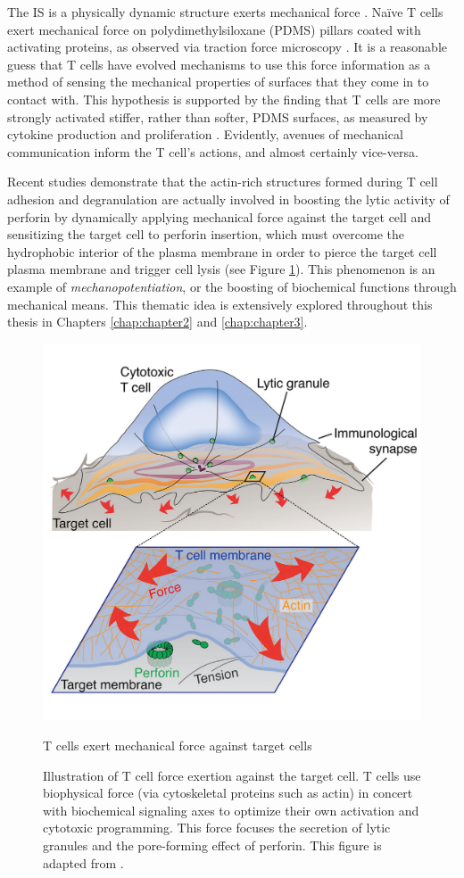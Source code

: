 The IS is a physically dynamic structure exerts mechanical force \cite{Ritter2015, Bashour2014}. Naïve T cells exert mechanical force on polydimethylsiloxane (PDMS) pillars coated with activating proteins, as observed via traction force microscopy \cite{Bashour2014}. It is a reasonable guess that T cells have evolved mechanisms to use this force information as a method of sensing the mechanical properties of surfaces that they come in to contact with. This hypothesis is supported by the finding that T cells are more strongly activated stiffer, rather than softer, PDMS surfaces, as measured by cytokine production and proliferation \cite{Connor2012}. Evidently, avenues of mechanical communication inform the T cell's actions, and almost certainly vice-versa.

Recent studies demonstrate that the actin-rich structures formed during T cell adhesion and degranulation are actually involved in boosting the lytic activity of perforin by dynamically applying mechanical force against the target cell \cite{Basu2016, Tamzalit2018} and sensitizing the target cell to perforin insertion, which must overcome the hydrophobic interior of the plasma membrane in order to pierce the target cell plasma membrane and trigger cell lysis (see Figure \ref{fig:mechforce}). This phenomenon is an example of \textit{mechanopotentiation}, or the boosting of biochemical functions through mechanical means. This thematic idea is extensively explored throughout this thesis in Chapters \ref{chap:chapter2} and \ref{chap:chapter3}.

\begin{figure}[htbp]
	\centering
	\includegraphics[width=0.8\columnwidth]{../figures/chapter1/mechforce.png}
	\caption{T cells exert mechanical force against target cells}
	\caption*{Illustration of T cell force exertion against the target cell. T cells use biophysical force (via cytoskeletal proteins such as actin) in concert with biochemical signaling axes to optimize their own activation and cytotoxic programming.  This force focuses the secretion of lytic granules and the pore-forming effect of perforin. This figure is adapted from \cite{Rak2011}.}
	\label{fig:mechforce}
\end{figure}

